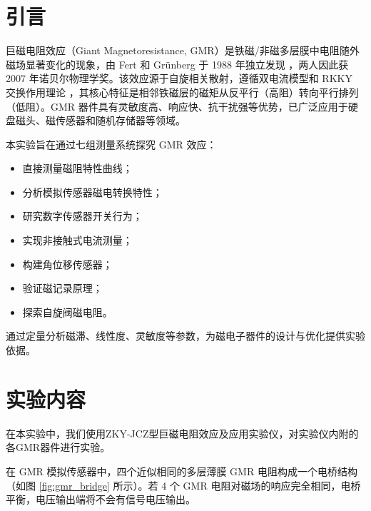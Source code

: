 \documentclass{thuemp}
\begin{document}
\section{引言}
\enlargethispage{-3.3cm}
巨磁电阻效应（Giant Magnetoresistance, GMR）是铁磁/非磁多层膜中电阻随外磁场显著变化的现象，由 Fert 和 Grünberg 于 1988 年独立发现 \cite{BAIBICH19882472,BINASCH19894828}，两人因此获 2007 年诺贝尔物理学奖。该效应源于自旋相关散射，遵循双电流模型和 RKKY 交换作用理论 \cite{PARKIN19902304}，其核心特征是相邻铁磁层的磁矩从反平行（高阻）转向平行排列（低阻）。GMR 器件具有灵敏度高、响应快、抗干扰强等优势，已广泛应用于硬盘磁头、磁传感器和随机存储器等领域。

本实验旨在通过七组测量系统探究 GMR 效应：
\begin{itemize}
    \item 直接测量磁阻特性曲线；
    \item 分析模拟传感器磁电转换特性；
    \item 研究数字传感器开关行为；
    \item 实现非接触式电流测量；
    \item 构建角位移传感器；
    \item 验证磁记录原理；
    \item 探索自旋阀磁电阻。
\end{itemize}
通过定量分析磁滞、线性度、灵敏度等参数，为磁电子器件的设计与优化提供实验依据。

\section{实验内容}

在本实验中，我们使用ZKY-JCZ型巨磁电阻效应及应用实验仪，对实验仪内附的各GMR器件进行实验。

在 GMR 模拟传感器中，四个近似相同的多层薄膜 GMR 电阻构成一个电桥结构（如图 \ref{fig:gmr_bridge} 所示）。若 4 个 GMR 电阻对磁场的响应完全相同，电桥平衡，电压输出端将不会有信号电压输出。
\end{document}
